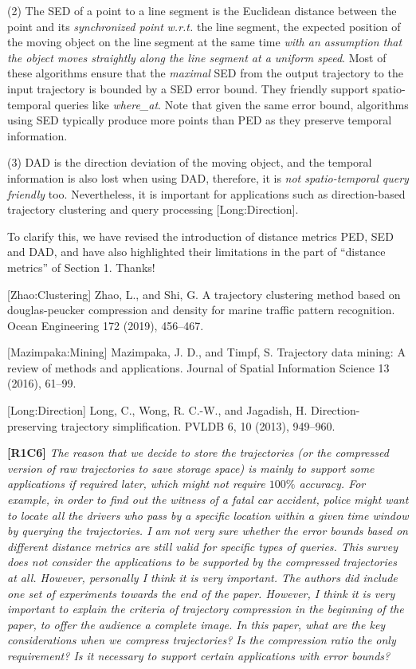 \documentclass{letter}
\newcommand{\wrt}{\emph{w.r.t.}\xspace}
\begin{document}
(2) The SED of a point to a line segment is the Euclidean distance between the point and its \emph{synchronized point} \wrt the line segment, the expected position of the moving object on the line segment at the same time \emph{with an assumption that the object moves straightly along the line segment at a uniform speed}. {Most of these algorithms ensure that the \emph{maximal} SED from the output trajectory to the input trajectory is bounded by a SED error bound.}
They friendly support spatio-temporal queries like \emph{where\_at}. {Note that given the same error bound, algorithms using SED typically produce more points than PED as they preserve temporal information.}

(3) DAD is the direction deviation of the moving object, and
the temporal information is also lost when using DAD, therefore, it is \emph{not spatio-temporal query friendly} too. Nevertheless, it is important for applications such as direction-based trajectory clustering and query processing [Long:Direction].

To clarify this, we have revised the introduction of distance metrics PED, SED and DAD, and have also highlighted their limitations in the part of ``distance metrics'' of Section 1. Thanks!

[Zhao:Clustering] Zhao, L., and Shi, G. A trajectory clustering method based on douglas-peucker compression and density for marine traffic pattern recognition. Ocean Engineering 172 (2019), 456--467.

[Mazimpaka:Mining] Mazimpaka, J. D., and Timpf, S. Trajectory data mining: A review of methods and applications. Journal of Spatial Information Science 13 (2016), 61--99.

[Long:Direction] Long, C., Wong, R. C.-W., and Jagadish, H. Direction-preserving trajectory simplification. PVLDB 6, 10 (2013), 949--960.

\textbf{[R1C6]} \emph{ The reason that we decide to store the trajectories (or the compressed version of raw trajectories to save storage space) is mainly to support some applications if required later, which might not require $100\%$ accuracy. For example, in order to find out the witness of a fatal car accident, police might want to locate all the drivers who pass by a specific location within a given time window by querying the trajectories. I am not very sure whether the error bounds based on different distance metrics are still valid for specific types of queries. {This survey does not consider the applications to be supported by the compressed trajectories at all. However, personally I think it is very important.} The authors did include one set of experiments towards the end of the paper. However, I think it is very important to explain the criteria of trajectory compression in the beginning of the paper, to offer the audience a complete image. In this paper, what are the key considerations when we compress trajectories? Is the compression ratio the only requirement? Is it necessary to support certain applications with error bounds? }
\end{document}
